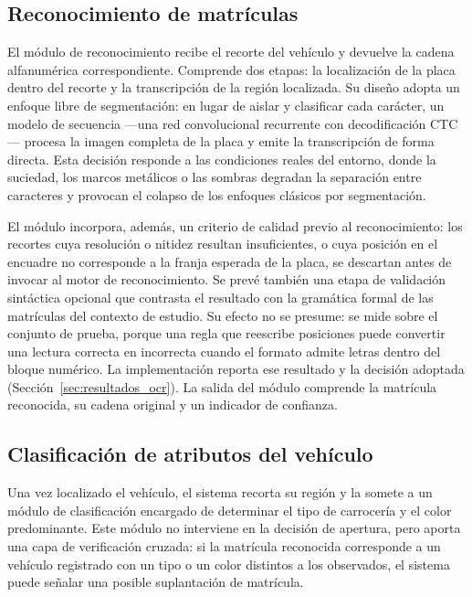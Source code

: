 \subsection{Reconocimiento de matrículas}

El módulo de reconocimiento recibe el recorte del vehículo y devuelve la cadena
alfanumérica correspondiente. Comprende dos etapas: la localización de la placa
dentro del recorte y la transcripción de la región localizada. Su diseño adopta
un enfoque libre de segmentación: en lugar de aislar y clasificar cada carácter,
un modelo de secuencia ---una red convolucional recurrente con decodificación
CTC--- procesa la imagen completa de la placa y emite la transcripción de forma
directa. Esta decisión responde a las condiciones reales del entorno, donde la
suciedad, los marcos metálicos o las sombras degradan la separación entre
caracteres y provocan el colapso de los enfoques clásicos por segmentación.

El módulo incorpora, además, un criterio de calidad previo al reconocimiento:
los recortes cuya resolución o nitidez resultan insuficientes, o cuya posición
en el encuadre no corresponde a la franja esperada de la placa, se descartan
antes de invocar al motor de reconocimiento. Se prevé también una etapa de
validación sintáctica opcional que contrasta el resultado con la gramática formal
de las matrículas del contexto de estudio. Su efecto no se presume: se mide sobre
el conjunto de prueba, porque una regla que reescribe posiciones puede convertir
una lectura correcta en incorrecta cuando el formato admite letras dentro del
bloque numérico. La implementación reporta ese resultado y la decisión adoptada
(Sección~\ref{sec:resultados_ocr}). La salida del módulo comprende la matrícula
reconocida, su cadena original y un indicador de confianza.

\subsection{Clasificación de atributos del vehículo}

Una vez localizado el vehículo, el sistema recorta su región y la somete a un
módulo de clasificación encargado de determinar el tipo de carrocería y el color
predominante.
Este módulo no interviene en la decisión de apertura, pero aporta una capa de
verificación cruzada: si la matrícula reconocida corresponde a un vehículo
registrado con un tipo o un color distintos a los observados, el sistema puede
señalar una posible suplantación de matrícula.

